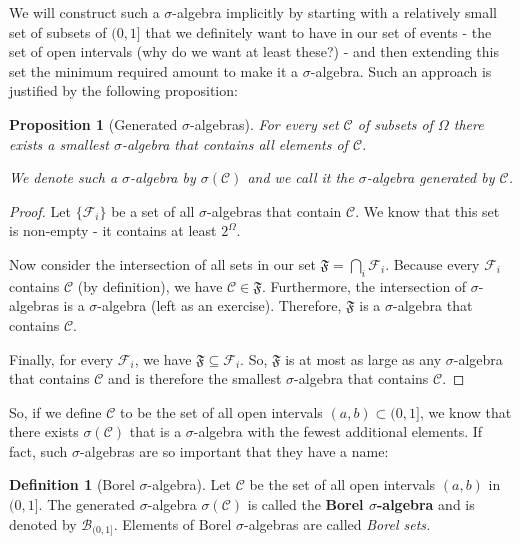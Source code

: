 \documentclass{book}
\theoremstyle{plain}%
\newtheorem{proposition}{Proposition}[section]
\theoremstyle{definition}
\newtheorem{definition}{Definition}[section]
\begin{document}
We will construct such a $\sigma$-algebra implicitly by starting with a relatively small set of subsets of $(0, 1]$ that we definitely want to have in our set of events - the set of open intervals (why do we want at least these?) - and then extending this set the minimum required amount to make it a $\sigma$-algebra. Such an approach is justified by the following proposition:

\begin{proposition}[Generated $\sigma$-algebras]
For every set $\mathcal{C}$ of subsets of $\Omega$ there exists a smallest $\sigma$-algebra that contains all elements of $\mathcal{C}$.

We denote such a $\sigma$-algebra by $\sigma(\mathcal{C})$ and we call it the $\sigma$-algebra generated by $\mathcal{C}$.\label{prop:generated_algebras}
\end{proposition}

\begin{proof}
Let $\{\mathcal{F}_i\}$ be a set of all $\sigma$-algebras that contain $\mathcal{C}$. We know that this set is non-empty - it contains at least $2^{{\Omega}}$.

Now consider the intersection of all sets in our set $\mathfrak{F} = \bigcap_{i} \mathcal{F}_i$. Because every $\mathcal{F}_i$ contains $\mathcal{C}$ (by definition), we have $\mathcal{C} \in \mathfrak{F}$. Furthermore, the intersection of $\sigma$-algebras is a $\sigma$-algebra (left as an exercise). Therefore, $\mathfrak{F}$ is a $\sigma$-algebra that contains $\mathcal{C}$.

Finally, for every $\mathcal{F}_i$, we have $\mathfrak{F} \subseteq \mathcal{F}_i$. So, $\mathfrak{F}$ is at most as large as any $\sigma$-algebra that contains $\mathcal{C}$ and is therefore the smallest $\sigma$-algebra that contains $\mathcal{C}$.
\end{proof}

So, if we define $\mathcal{C}$ to be the set of all open intervals $(a,b) \subset (0,1]$, we know that there exists $\sigma(\mathcal{C})$ that is a $\sigma$-algebra with the fewest additional elements. If fact, such $\sigma$-algebras are so important that they have a name:

\begin{definition}[Borel $\sigma$-algebra] Let $\mathcal{C}$ be the set of all open intervals $(a, b)$ in $(0,1]$. The generated $\sigma$-algebra $\sigma(\mathcal{C})$ is called the \textbf{Borel $\sigma$-algebra} and is denoted by $\mathcal{B}_{(0,1]}$. Elements of Borel $\sigma$-algebras are called \emph{Borel sets.}
\end{definition}
\end{document}
